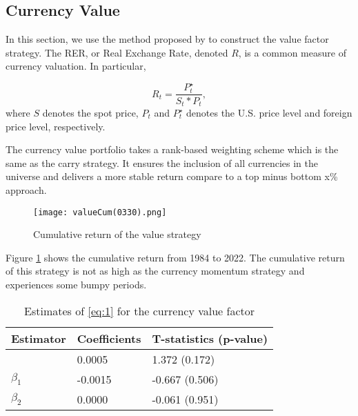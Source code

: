 \documentclass[12pt,a4paper]{article}
\begin{document}
\subsection{Currency Value}
In this section, we use the method proposed by \citet*{MSSS2017} to construct the value factor strategy. The RER, or Real Exchange Rate, denoted $R$, is a common measure of currency valuation. 
In particular, 

\begin{equation}
	R_{t} = \frac{P_{t}^{\star}}{S_{t}*P_{t}}, 
\end{equation}
where $S$ denotes the spot price, $P_{t}$ and $P_{t}^{\star}$
denotes the U.S. price level and foreign price level, respectively. 

The currency value portfolio takes a rank-based weighting scheme which is the same as the \citet*{KMMV2018} carry strategy. 
It ensures the inclusion of all currencies in the universe 
and delivers a more stable return compare to a top minus bottom x\% approach. 

\begin{figure}
	\texttt{[image: valueCum(0330).png]}
	\caption{Cumulative return of the value strategy}
\label{fig:valueCum}
\end{figure}

Figure \ref{fig:valueCum} shows the cumulative return from 1984 to 2022. The cumulative return
of this strategy is not as high as the currency momentum strategy and experiences some bumpy periods. 

\begin{table}[!htb]
	
	\caption{Estimates of \ref{eq:1} for the currency value factor} 
	
	\leftskip=0.75cm\rightskip=0.75cm
	\footnotesize
	
	\centering
	
	\begin{footnotesize}
		
		\begin{tabular}{L{2cm}C{2cm}C{4cm}}
			\toprule
			Estimator &  Coefficients & T-statistics (p-value)    \\
			\midrule
			& 0.0005 & 1.372 (0.172)\\
			$\beta_{1}$ & -0.0015 & -0.667 (0.506)\\
			$\beta_{2}$ & 0.0000 & -0.061 (0.951)\\
			\bottomrule
		\end{tabular}
		
	\end{footnotesize}
	
\label{table:valueHypo}
\end{table}
\end{document}
